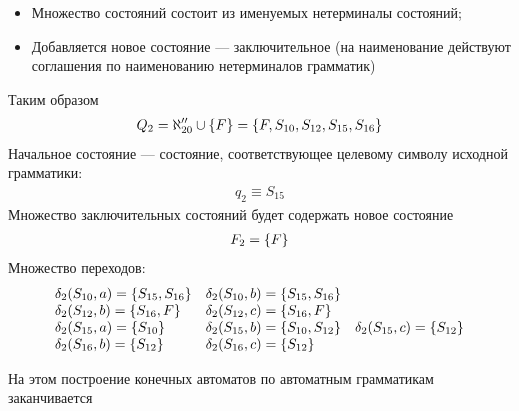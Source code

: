 \begin{itemize}
	      \begin{itemize}
		      \item Множество состояний состоит из именуемых нетерминалы состояний;
		      \item Добавляется новое состояние --- заключительное (на наименование действуют соглашения по наименованию нетерминалов грамматик)
	      \end{itemize}
	      Таким образом
	      \begin{align*}
		      Q_2 = \aleph''_{20} \cup \left\{F\right\} = \left\{F, S_{10}, S_{12}, S_{15}, S_{16}\right\}
	      \end{align*}
	      Начальное состояние --- состояние, соответствующее целевому символу исходной грамматики:
	      \begin{align*}
		      q_2 \equiv S_{15}
	      \end{align*}
	      Множество заключительных состояний будет содержать новое состояние
	      \begin{align*}
		      F_2 = \left\{F\right\}
	      \end{align*}
	      Множество переходов:
	      \begin{align*}
		      \begin{array}{lll}
			      \delta_2(S_{10}, a) = \left\{S_{15}, S_{16}\right\} & \delta_2(S_{10}, b) = \left\{S_{15}, S_{16}\right\}                                      \\
			      \delta_2(S_{12}, b) = \left\{S_{16}, F\right\}      & \delta_2(S_{12}, c) = \left\{S_{16}, F\right\}                                           \\
			      \delta_2(S_{15}, a) = \left\{S_{10}\right\}         & \delta_2(S_{15}, b) = \left\{S_{10}, S_{12}\right\} & \delta_2(S_{15}, c) = \left\{S_{12}\right\} \\
			      \delta_2(S_{16}, b) = \left\{S_{12}\right\}         & \delta_2(S_{16}, c) = \left\{S_{12}\right\}
		      \end{array}
	      \end{align*}
\end{itemize}
На этом построение конечных автоматов по автоматным грамматикам заканчивается
